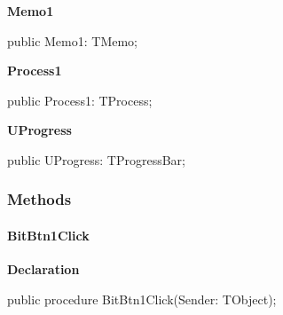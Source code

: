 \documentclass{report}
\newif\ifpdf
\begin{document}
\begin{list}{}
\par  \label{uninstall.TRMForm-Memo1}
\item[\textbf{Memo1}\hfill]
\ifpdf
\begin{flushleft}
\fi
\begin{ttfamily}
public Memo1: TMemo;\end{ttfamily}

\ifpdf
\end{flushleft}
\fi


\par  \label{uninstall.TRMForm-Process1}
\item[\textbf{Process1}\hfill]
\ifpdf
\begin{flushleft}
\fi
\begin{ttfamily}
public Process1: TProcess;\end{ttfamily}

\ifpdf
\end{flushleft}
\fi


\par  \label{uninstall.TRMForm-UProgress}
\item[\textbf{UProgress}\hfill]
\ifpdf
\begin{flushleft}
\fi
\begin{ttfamily}
public UProgress: TProgressBar;\end{ttfamily}

\ifpdf
\end{flushleft}
\fi


\par  \end{list}
\subsubsection*{\large{\textbf{Methods}}\normalsize\hspace{1ex}\hfill}
\paragraph*{BitBtn1Click}\hspace*{\fill}

\label{uninstall.TRMForm-BitBtn1Click}
\begin{list}{}{
\setlength{\itemindent}{0cm}
\setlength{\listparindent}{0cm}
\setlength{\leftmargin}{\evensidemargin}
\addtolength{\leftmargin}{\tmplength}
\settowidth{\labelsep}{X}
\addtolength{\leftmargin}{\labelsep}
\setlength{\labelwidth}{\tmplength}
}
\item[\textbf{Declaration}\hfill]
\ifpdf
\begin{flushleft}
\fi
\begin{ttfamily}
public procedure BitBtn1Click(Sender: TObject);\end{ttfamily}

\ifpdf
\end{flushleft}
\fi

\end{list}
\end{document}
